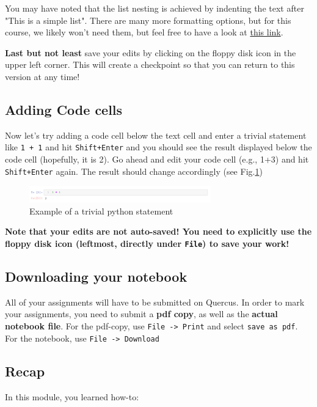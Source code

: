 \documentclass[svgnames, 11pt, lettersize]{article}
\begin{document}
You may have noted that the list nesting is achieved by 
indenting the text after "This is a simple list". There are many more
formatting options, but for this course, we likely won't need them,
but feel free to have a look at \href{https://guides.github.com/features/mastering-markdown/}{this link}.

\textbf{Last but not least} save your edits by clicking on the floppy disk
icon in the upper left corner. This will create a checkpoint so that
you can return to this version at any time!
\subsection{Adding Code cells}
\label{sec:orgd1c2e56}
Now let's try adding a code cell below the text cell and enter a
trivial statement like \texttt{1 + 1} and hit \texttt{Shift+Enter} and you should
see the result displayed below the code cell (hopefully, it is
2). Go ahead and edit your code cell (e.g., 1+3) and hit \texttt{Shift+Enter}
again. The result should change accordingly (see Fig.\ref{codesnap})
\begin{figure}[htbp]
\centering
\includegraphics[width=0.7\textwidth]{./figures/Screenshot_20200527_161029.png}
\caption{\label{codesnap}Example of a trivial python statement}
\end{figure}

\textbf{Note that your edits are not auto-saved! You need to explicitly use the
floppy disk icon (leftmost, directly under \texttt{File}) to save your work!}
\subsection{Downloading your notebook}
\label{sec:orgc4d2f70}
All of your assignments will have to be submitted on Quercus. In order
to mark your assignments, you need to submit a \textbf{pdf copy}, as well as
the \textbf{actual notebook file}.  For the pdf-copy, use \texttt{File -> Print}  and select \texttt{save as pdf}. For the notebook, use \texttt{File -> Download} 
\subsection{Recap}
\label{sec:orgd187af8}
In this module, you learned how-to:
\end{document}
